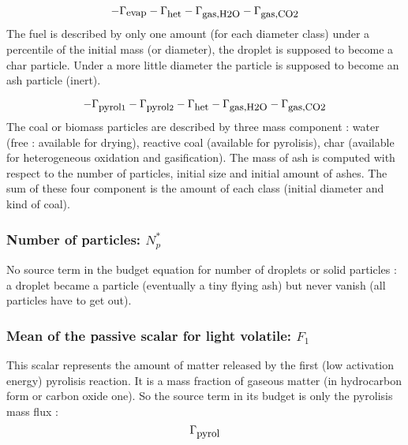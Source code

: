 \begin{equation}
     -\Gamma_{\mbox{\small evap}}-\Gamma_{\mbox{\small het}}-\Gamma_{\mbox{\small gas,H2O}}-\Gamma_{\mbox{\small gas,CO2}}
\end{equation}
The fuel is described by only one amount (for each diameter class) under a
percentile of the initial mass (or diameter), the droplet is supposed to become
a char particle. Under a more little diameter the particle is supposed to become
an ash particle (inert).

\begin{equation}
     -\Gamma_{\mbox{\small pyrol}1}-\Gamma_{\mbox{\small pyrol}2}-\Gamma_{\mbox{\small het}}-\Gamma_{\mbox{\small gas,H2O}}-\Gamma_{\mbox{\small gas,CO2}}
\end{equation}
The coal or biomass particles are described by three mass component : water
(free : available for drying), reactive coal (available for pyrolisis), char
(available for heterogeneous oxidation and gasification). The mass of ash is
computed with respect to the number of particles, initial size and initial
amount of ashes. The sum of these four component is the amount of each class
(initial diameter and kind of coal).
          
\subsubsection*{Number of particles: $N_{p}^{*}$}
No source term in the budget equation for number of droplets or solid particles
: a droplet became a particle (eventually a tiny flying ash) but never vanish
(all particles have to get out).

                                
\subsubsection*{Mean of the passive scalar for light volatile: $F_{1}$}  

This scalar represents the amount of matter released by the first (low
activation energy) pyrolisis reaction. It is a mass fraction of gaseous matter
(in hydrocarbon form or carbon oxide one). So the source term in its budget is
only the pyrolisis mass flux :
\begin{equation}
    \Gamma _{\mbox{\small pyrol}}
\end{equation}
